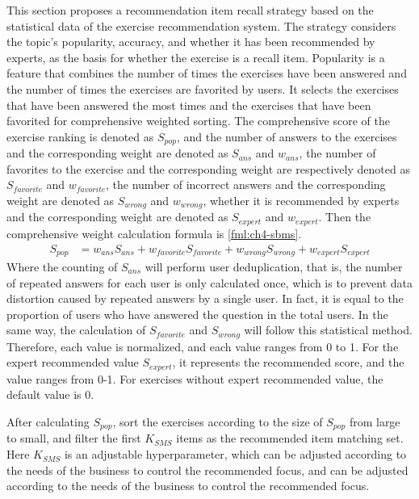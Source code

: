 This section proposes a recommendation item recall strategy based on the statistical data of the exercise recommendation system. The strategy considers the topic's popularity, accuracy, and whether it has been recommended by experts, as the basis for whether the exercise is a recall item. Popularity is a feature that combines the number of times the exercises have been answered and the number of times the exercises are favorited by users. It selects the exercises that have been answered the most times and the exercises that have been favorited for comprehensive weighted sorting. The comprehensive score of the exercise ranking is denoted as \(S_{pop}\), and the number of answers to the exercises and the corresponding weight are denoted as \(S_{ans}\) and \(w_{ans}\), the number of favorites to the exercise and the corresponding weight are respectively denoted as \(S_{favorite}\) and \(w_{favorite} \), the number of incorrect answers and the corresponding weight are denoted as \(S_{wrong}\) and \(w_{wrong}\), whether it is recommended by experts and the corresponding weight are denoted as \(S_{expert}\) and \(w_{expert}\). Then the comprehensive weight calculation formula is \ref{fml:ch4-sbms}.
\begin{align}
  S_{pop} & = w_{ans}S_{ans}+w_{favorite}S_{favorite}+w_{wrong}S_{wrong}+w_{expert}S_{expert}\label{fml:ch4-sbms}
\end{align}
Where the counting of \(S_{ans}\) will perform user deduplication, that is, the number of repeated answers for each user is only calculated once, which is to prevent data distortion caused by repeated answers by a single user. In fact, it is equal to the proportion of users who have answered the question in the total users. In the same way, the calculation of \(S_{favorite}\) and \(S_{wrong}\) will follow this statistical method. Therefore, each value is normalized, and each value ranges from 0 to 1. For the expert recommended value \(S_{expert}\), it represents the recommended score, and the value ranges from 0-1. For exercises without expert recommended value, the default value is 0.

After calculating \(S_{pop}\), sort the exercises according to the size of \(S_{pop}\) from large to small, and filter the first \(K_{SMS}\) items as the recommended item matching set. Here \(K_{SMS}\) is an adjustable hyperparameter, which can be adjusted according to the needs of the business to control the recommended focus, and can be adjusted according to the needs of the business to control the recommended focus.

